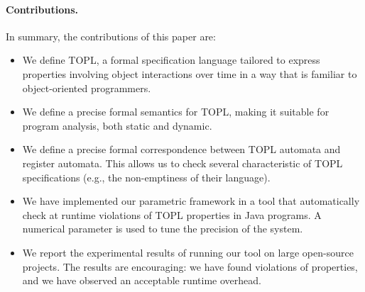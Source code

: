 \documentclass[9pt, preprint]{sigplanconf} %
\theoremstyle{definition}
\theoremstyle{remark}
\begin{document}

\paragraph{Contributions.}
In summary, the contributions of this paper are:
\begin{itemize}
\item We define TOPL, a formal specification language tailored to express properties involving object interactions over time in a way that is familiar to object-oriented programmers.
\item We define a precise formal semantics for TOPL, making it suitable for program analysis, both static and dynamic.
\item We define a precise formal correspondence between TOPL automata and register automata. This allows us to check several characteristic of TOPL specifications (e.g., the non-emptiness of their language).
\item We have implemented our parametric framework  in a tool that automatically check at runtime violations of TOPL properties in Java programs. A numerical parameter is used to tune the precision of the system.

\item We report the experimental results of running our tool on large open-source projects. The results are encouraging: we have found
violations of properties, and we have observed an acceptable runtime overhead. 
\end{itemize}
\end{document}
